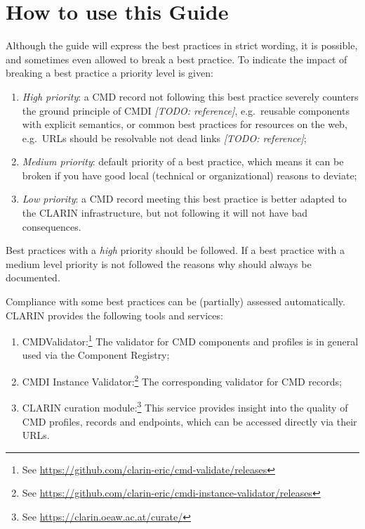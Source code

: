 \section{How to use this Guide}

Although the guide will express the best practices in strict wording, it
is possible, and sometimes even allowed to break a best practice. To
indicate the impact of breaking a best practice a priority level is
given:

\begin{enumerate}
\def\labelenumi{\arabic{enumi}.}
\tightlist
\item
  \emph{High priority}: a CMD record not following this best practice
  severely counters the ground principle of CMDI \emph{{[}TODO:
  reference{]}}, e.g.~reusable components with explicit semantics, or
  common best practices for resources on the web, e.g.~URLs should be
  resolvable not dead links \emph{{[}TODO: reference{]}};
\item
  \emph{Medium priority}: default priority of a best practice, which
  means it can be broken if you have good local (technical or
  organizational) reasons to deviate;
\item
  \emph{Low priority}: a CMD record meeting this best practice is better
  adapted to the CLARIN infrastructure, but not following it will not
  have bad consequences.
\end{enumerate}

Best practices with a \emph{high} priority should be followed. If a best
practice with a medium level priority is not followed the reasons why
should always be documented.

Compliance with some best practices can be (partially) assessed
automatically. CLARIN provides the following tools and services:

\begin{enumerate}
\def\labelenumi{\arabic{enumi}.}
\tightlist
\item
  CMDValidator:\footnote{See
    \url{https://github.com/clarin-eric/cmd-validate/releases}} The
  validator for CMD components and profiles is in general used via the
  Component Registry;
\item
  CMDI Instance Validator:\footnote{See
    \url{https://github.com/clarin-eric/cmdi-instance-validator/releases}}
  The corresponding validator for CMD records;
\item
  CLARIN curation module:\footnote{See
    \url{https://clarin.oeaw.ac.at/curate/}} This service provides
  insight into the quality of CMD profiles, records and endpoints, which
  can be accessed directly via their URLs.
\end{enumerate}

